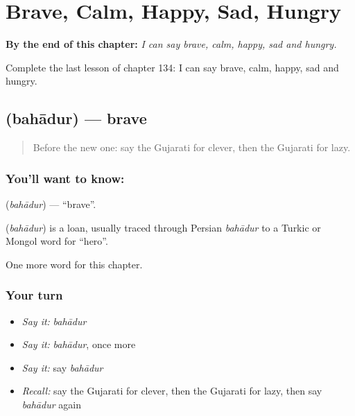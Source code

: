 
\chapter{Brave, Calm, Happy, Sad, Hungry}
\label{ch:gu-brave-calm-happy-sad-hungry}

\begin{chapteropening}
\textbf{By the end of this chapter:} \emph{I can say brave, calm, happy, sad and hungry.}

Complete the last lesson of chapter 134: I can say brave, calm, happy, sad and hungry.
\end{chapteropening}

\section[\texorpdfstring{\gu{બહાદુર} (bahādur)}{બહાદુર (bahādur)}]{ (bahādur) — brave}

\label{lesson:GU-C134-bahadur}



\begin{quote}
Before the new one: say the Gujarati for clever, then the Gujarati for lazy.
\end{quote}

\subsection*{You'll want to know: }
\textbf{} (\emph{bahādur}) — \textquotedblleft{}brave\textquotedblright{}.

\begin{cousinweb}
\textbf{} (\emph{bahādur}) is a loan, usually traced through Persian \emph{bahādur} to a Turkic or Mongol word for \textquotedblleft{}hero\textquotedblright{}.
\end{cousinweb}

\begin{grammarlens}[title={What you've built}]
One more word for this chapter.
\end{grammarlens}

\subsection*{Your turn}
\begin{itemize}
\raggedright
  \item \emph{Say it:} \emph{bahādur}
  \item \emph{Say it:} \emph{bahādur}, once more
  \item \emph{Say it:} say \emph{bahādur}
  \item \emph{Recall:} say the Gujarati for clever, then the Gujarati for lazy, then say \emph{bahādur} again
\end{itemize}

